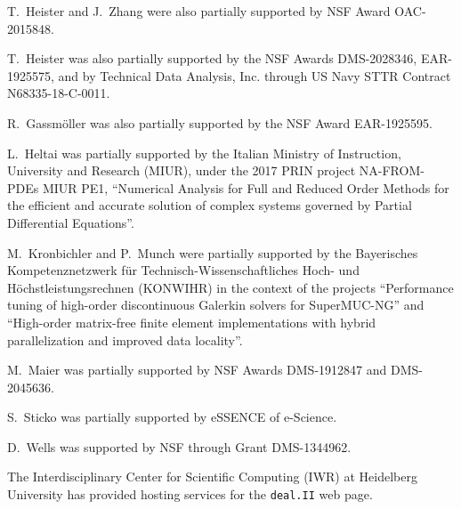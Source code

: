 \documentclass{ansarticle-preprint}
\newcommand{\specialword}[1]{\texttt{#1}}
\newcommand{\dealii}{{\specialword{deal.II}}\xspace}
\begin{document}
T.~Heister and J.~Zhang were also partially supported by NSF
Award OAC-2015848.

T.~Heister was also partially supported by the NSF Awards DMS-2028346,
EAR-1925575, and by Technical Data Analysis, Inc. through US Navy STTR
Contract N68335-18-C-0011.

R.~Gassm{\"o}ller was also partially supported by the NSF Award
EAR-1925595.

L.~Heltai was partially supported by the Italian Ministry of Instruction,
University and Research (MIUR), under the 2017 PRIN project NA-FROM-PDEs MIUR
PE1, ``Numerical Analysis for Full and Reduced Order Methods for the efficient
and accurate solution of complex systems governed by Partial Differential
Equations''.

M.~Kronbichler and P.~Munch were partially supported by the
Bayerisches Kompetenznetzwerk
f\"ur Technisch-Wissen\-schaft\-li\-ches Hoch- und H\"ochstleistungsrechnen
(KONWIHR) in the context of the projects
``Performance tuning of high-order discontinuous Galerkin solvers for
SuperMUC-NG'' and ``High-order matrix-free finite element implementations with
hybrid parallelization and improved data locality''.

M.~Maier was partially supported by NSF Awards DMS-1912847 and DMS-2045636.

S.~Sticko was partially supported by eSSENCE of e-Science.

D.~Wells was supported by NSF through Grant DMS-1344962.

The Interdisciplinary Center for Scientific Computing (IWR) at Heidelberg
University has provided hosting services for the \dealii{} web page.

{}

\end{document}
